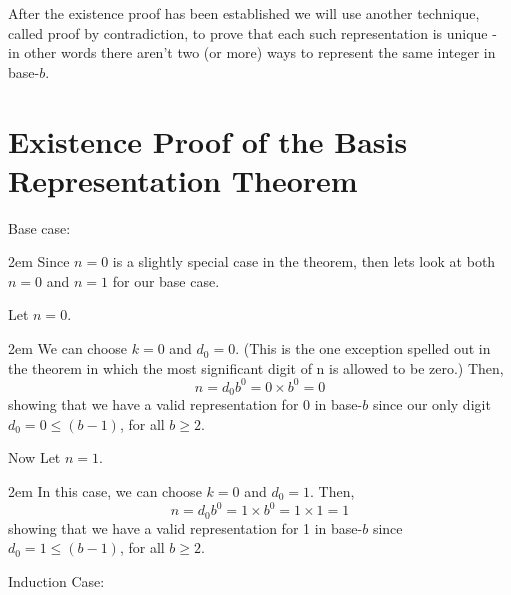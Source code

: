 \documentclass{article}
\newenvironment{jprIn}{\begin{adjustwidth}{2em}{}}{\end{adjustwidth}}
\begin{document}
After the existence proof has been established we will use another technique, called proof by contradiction,
to prove that each such representation is unique - in other
words there aren't two (or more) ways to represent the same integer in base-$b$.

\section*{Existence Proof of the Basis Representation Theorem}

Base case:
\begin{jprIn}
Since $n=0$ is a slightly special case in the theorem, then lets look at both $n=0$ and $n=1$ for our base case.

Let $n=0$.

\begin{jprIn}
We can choose $k=0$ and $d_0=0$.
(This is the one exception spelled out in the theorem in
which the most significant digit of n is allowed to be zero.) Then,
\[n=d_0b^0=0\times{}b^0=0\]
showing that we have a valid representation for 0 in base-$b$ since our only digit\\
$d_0=0\le(b-1)$, for all $b\ge2$.
\end{jprIn}

Now Let $n=1$.

\begin{jprIn}
In this case, we can choose $k=0$ and $d_0=1$.  Then,
\[n=d_0b^0=1\times{}b^0=1\times{}1=1\]
showing that we have a valid representation for 1 in base-$b$ since\\
$d_0=1\le(b-1)$, for all $b\ge2$.
\end{jprIn}
\end{jprIn}
\bigskip

\break
Induction Case:
\end{document}
